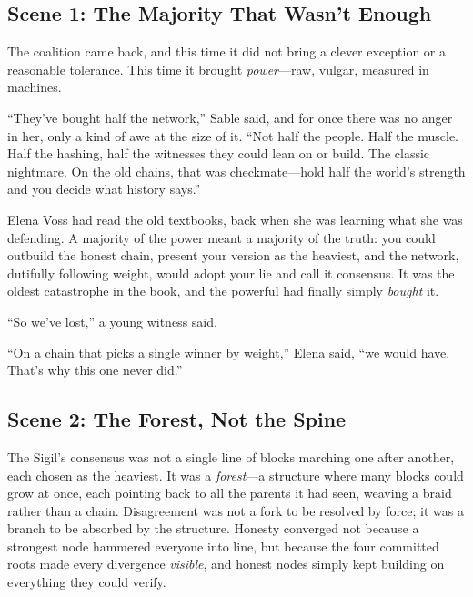 \documentclass[12pt,letterpaper]{book}
\begin{document}
\hypertarget{scene-1-the-majority-that-wasnt-enough}{%
\subsection{Scene 1: The Majority That Wasn't
Enough}\label{scene-1-the-majority-that-wasnt-enough}}

The coalition came back, and this time it did not bring a clever exception or a
reasonable tolerance. This time it brought \emph{power}---raw, vulgar, measured in
machines.

``They've bought half the network,'' Sable said, and for once there was no anger in
her, only a kind of awe at the size of it. ``Not half the people. Half the muscle.
Half the hashing, half the witnesses they could lean on or build. The classic
nightmare. On the old chains, that was checkmate---hold half the world's strength
and you decide what history says.''

Elena Voss had read the old textbooks, back when she was learning what she was
defending. A majority of the power meant a majority of the truth: you could outbuild
the honest chain, present your version as the heaviest, and the network, dutifully
following weight, would adopt your lie and call it consensus. It was the oldest
catastrophe in the book, and the powerful had finally simply \emph{bought} it.

``So we've lost,'' a young witness said.

``On a chain that picks a single winner by weight,'' Elena said, ``we would have.
That's why this one never did.''

\hypertarget{scene-2-the-forest-not-the-spine}{%
\subsection{Scene 2: The Forest, Not the
Spine}\label{scene-2-the-forest-not-the-spine}}

The Sigil's consensus was not a single line of blocks marching one after another,
each chosen as the heaviest. It was a \emph{forest}---a structure where many blocks
could grow at once, each pointing back to all the parents it had seen, weaving a
braid rather than a chain. Disagreement was not a fork to be resolved by force; it
was a branch to be absorbed by the structure. Honesty converged not because a
strongest node hammered everyone into line, but because the four committed roots
made every divergence \emph{visible}, and honest nodes simply kept building on
everything they could verify.
\end{document}

